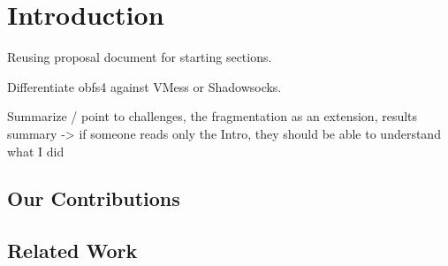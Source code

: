 \chapter{Introduction}\label{ch:intorduction}

Reusing proposal document for starting sections.

Differentiate obfs4 against VMess or Shadowsocks.

Summarize / point to challenges, the fragmentation as an extension, results summary
-> if someone reads only the Intro, they should be able to understand what I did

\section{Our Contributions} \label{sec:contributions}

\section{Related Work} \label{sec:related-work}
